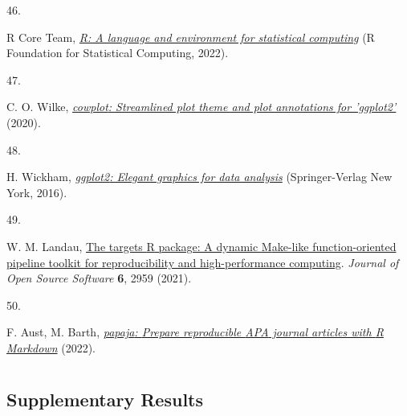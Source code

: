 \documentclass[
  man,floatsintext]{apa6}
\newlength{\cslhangindent}
\newlength{\csllabelwidth}
\newlength{\cslentryspacingunit} %
\newenvironment{CSLReferences}[2] %
 {%
  \setlength{\parindent}{0pt}
  \ifodd #1
  \let\oldpar\par
  \def\par{\hangindent=\cslhangindent\oldpar}
  \fi
  \setlength{\parskip}{#2\cslentryspacingunit}
 }%
 {}
\newcommand{\CSLLeftMargin}[1]{\parbox[t]{\csllabelwidth}{#1}}
\newcommand{\CSLRightInline}[1]{\parbox[t]{\linewidth - \csllabelwidth}{#1}\break}
\begin{document}
\begin{CSLReferences}{0}{0}
\leavevmode{}%
\CSLLeftMargin{46. }%
\CSLRightInline{R Core Team, \emph{\href{https://www.R-project.org/}{R: A language and environment for statistical computing}} (R Foundation for Statistical Computing, 2022).}

\leavevmode{}%
\CSLLeftMargin{47. }%
\CSLRightInline{C. O. Wilke, \emph{\href{https://CRAN.R-project.org/package=cowplot}{{cowplot}: Streamlined plot theme and plot annotations for 'ggplot2'}} (2020).}

\leavevmode{}%
\CSLLeftMargin{48. }%
\CSLRightInline{H. Wickham, \emph{\href{https://ggplot2.tidyverse.org}{{ggplot2}: Elegant graphics for data analysis}} (Springer-Verlag New York, 2016).}

\leavevmode{}%
\CSLLeftMargin{49. }%
\CSLRightInline{W. M. Landau, \href{https://doi.org/10.21105/joss.02959}{The targets {R} package: A dynamic {M}ake-like function-oriented pipeline toolkit for reproducibility and high-performance computing}. \emph{Journal of Open Source Software} \textbf{6}, 2959 (2021).}

\leavevmode{}%
\CSLLeftMargin{50. }%
\CSLRightInline{F. Aust, M. Barth, \emph{\href{https://github.com/crsh/papaja}{{papaja}: {Prepare} reproducible {APA} journal articles with {R Markdown}}} (2022).}

\end{CSLReferences}

\endgroup

\newpage

\hypertarget{appendix-appendix}{%
\appendix}


\renewcommand{\appendixname}{\textbf{Supplementary Materials}}
\renewcommand{\thefigure}{S\arabic{figure}} \setcounter{figure}{0}
\renewcommand{\thetable}{S\arabic{table}} \setcounter{table}{0}
\renewcommand{\theequation}{S\arabic{table}} \setcounter{equation}{0}

\hypertarget{section}{%
\section{}\label{section}}

\hypertarget{supplementary-results}{%
\subsection{Supplementary Results}\label{supplementary-results}}
\end{document}
